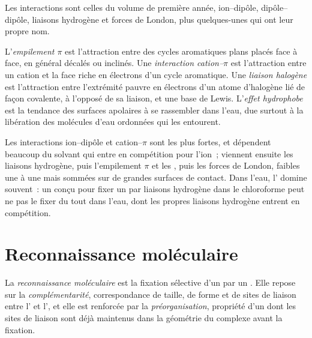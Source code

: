 Les interactions sont celles du volume de première année, ion--dipôle,
dipôle--dipôle, liaisons hydrogène et forces de London, plus quelques-unes
qui ont leur propre nom.

\begin{definition}\label{def:b3:supramolecular:interactions}
L'\emph{empilement $\pi$} est l'attraction entre des cycles
aromatiques plans placés face à face, en général décalés ou inclinés. Une
\emph{interaction cation--$\pi$} est l'attraction entre un cation et
la face riche en électrons d'un cycle aromatique. Une \emph{liaison halogène}
est l'attraction entre l'extrémité pauvre en électrons d'un atome d'halogène
lié de façon covalente, à l'opposé de sa liaison, et une base de Lewis.
L'\emph{effet hydrophobe} est la tendance des
surfaces apolaires à se rassembler dans l'eau, due surtout à la libération
des molécules d'eau ordonnées qui les entourent.
\end{definition}

Les interactions ion--dipôle et cation--$\pi$ sont les plus fortes, et
dépendent beaucoup du solvant qui entre en compétition pour l'ion~; viennent
ensuite les liaisons hydrogène, puis l'empilement $\pi$ et les , puis les forces de
London, faibles une à une mais sommées sur de grandes surfaces de contact.
Dans l'eau, l' domine souvent~: un  conçu pour fixer un
 par liaisons hydrogène dans le chloroforme peut ne pas le fixer du
tout dans l'eau, dont les propres liaisons hydrogène entrent en
compétition.

\section{Reconnaissance moléculaire}

\begin{definition}\label{def:b3:supramolecular:recognition}
La \emph{reconnaissance moléculaire} est la fixation
sélective d'un  par un . Elle repose sur la \emph{complémentarité},
correspondance de taille, de forme et de sites de liaison entre l' et
l', et elle est renforcée par la \emph{préorganisation}, propriété
d'un  dont les sites de liaison sont déjà maintenus dans la géométrie
du complexe avant la fixation.
\end{definition}

